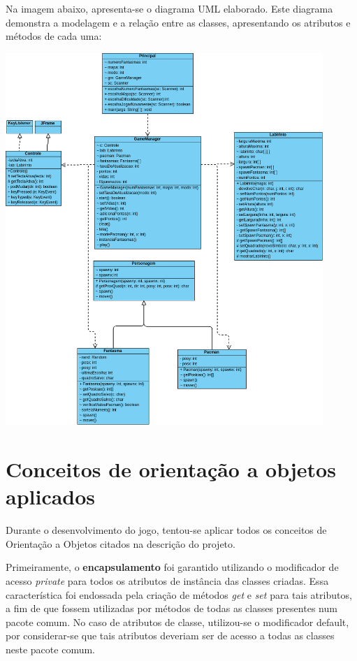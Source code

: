 \documentclass[]{article}
\begin{document}
Na imagem abaixo, apresenta-se o diagrama UML elaborado. Este diagrama demonstra a modelagem e a relação entre as classes, apresentando os atributos e métodos de cada uma:

\begin{center}
\includegraphics[width=12cm]{UML.png}
\end{center}

\section{Conceitos de orientação a objetos aplicados}
Durante o desenvolvimento do jogo, tentou-se aplicar todos os conceitos de Orientação a Objetos citados na descrição do projeto.

Primeiramente, o \textbf{encapsulamento} foi garantido utilizando o modificador de acesso \textsl{private} para todos os atributos de instância das classes criadas. Essa característica foi endossada pela criação de métodos \textsl{get} e \textsl{set} para tais atributos, a fim de que fossem utilizadas por métodos de todas as classes presentes num pacote comum. No caso de atributos de classe, utilizou-se o modificador default, por considerar-se que tais atributos deveriam ser de acesso a todas as classes neste pacote comum.
\end{document}
